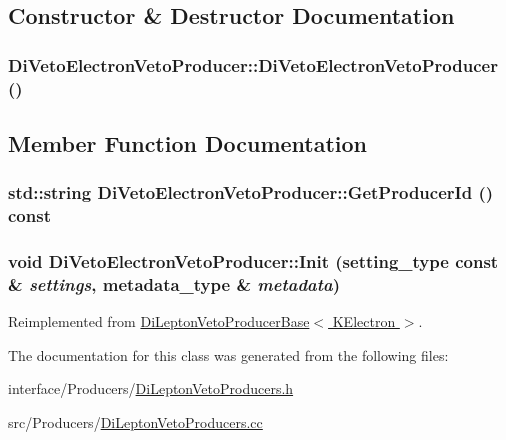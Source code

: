 \subsection{Constructor \& Destructor Documentation}
\hypertarget{classDiVetoElectronVetoProducer_adc3033ffcd412c0fad5051ad3e2c1b21}{
\subsubsection[{DiVetoElectronVetoProducer}]{\setlength{\rightskip}{0pt plus 5cm}DiVetoElectronVetoProducer::DiVetoElectronVetoProducer ()}}
\label{classDiVetoElectronVetoProducer_adc3033ffcd412c0fad5051ad3e2c1b21}


\subsection{Member Function Documentation}
\hypertarget{classDiVetoElectronVetoProducer_a26a4b0a9259f5272f8dc774a8cfbf12d}{
\subsubsection[{GetProducerId}]{\setlength{\rightskip}{0pt plus 5cm}std::string DiVetoElectronVetoProducer::GetProducerId () const}}
\label{classDiVetoElectronVetoProducer_a26a4b0a9259f5272f8dc774a8cfbf12d}
\hypertarget{classDiVetoElectronVetoProducer_ac741e779b47951598f628b190d883eda}{
\subsubsection[{Init}]{\setlength{\rightskip}{0pt plus 5cm}void DiVetoElectronVetoProducer::Init (setting\_\-type const \& {\em settings}, \/  metadata\_\-type \& {\em metadata})}}
\label{classDiVetoElectronVetoProducer_ac741e779b47951598f628b190d883eda}


Reimplemented from \hyperlink{classDiLeptonVetoProducerBase_a759df02383c27e660029ce98bdac99ca}{DiLeptonVetoProducerBase$<$ KElectron $>$}.

The documentation for this class was generated from the following files:\begin{DoxyCompactItemize}
\item 
interface/Producers/\hyperlink{DiLeptonVetoProducers_8h}{DiLeptonVetoProducers.h}\item 
src/Producers/\hyperlink{DiLeptonVetoProducers_8cc}{DiLeptonVetoProducers.cc}\end{DoxyCompactItemize}
